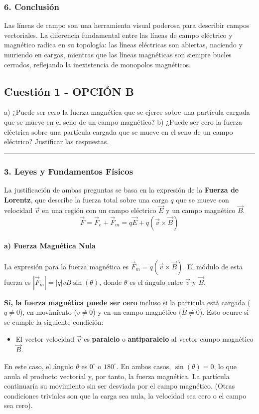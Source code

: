 \subsubsection*{6. Conclusión}
\begin{cajaconclusion}
Las líneas de campo son una herramienta visual poderosa para describir campos vectoriales. La diferencia fundamental entre las líneas de campo eléctrico y magnético radica en su topología: las líneas eléctricas son abiertas, naciendo y muriendo en cargas, mientras que las líneas magnéticas son siempre bucles cerrados, reflejando la inexistencia de monopolos magnéticos.
\end{cajaconclusion}

\newpage

\subsection{Cuestión 1 - OPCIÓN B}
\label{subsec:4B_2000_sep_ext}

\begin{cajaenunciado}
a) ¿Puede ser cero la fuerza magnética que se ejerce sobre una partícula cargada que se mueve en el seno de un campo magnético?
b) ¿Puede ser cero la fuerza eléctrica sobre una partícula cargada que se mueve en el seno de un campo eléctrico?
Justificar las respuestas.
\end{cajaenunciado}
\hrule

\subsubsection*{3. Leyes y Fundamentos Físicos}
La justificación de ambas preguntas se basa en la expresión de la \textbf{Fuerza de Lorentz}, que describe la fuerza total sobre una carga $q$ que se mueve con velocidad $\vec{v}$ en una región con un campo eléctrico $\vec{E}$ y un campo magnético $\vec{B}$.
$$ \vec{F} = \vec{F}_e + \vec{F}_m = q\vec{E} + q(\vec{v} \times \vec{B}) $$

\paragraph{a) Fuerza Magnética Nula}
La expresión para la fuerza magnética es $\vec{F}_m = q(\vec{v} \times \vec{B})$. El módulo de esta fuerza es $|\vec{F}_m| = |q|vB\sin(\theta)$, donde $\theta$ es el ángulo entre $\vec{v}$ y $\vec{B}$.

\textbf{Sí, la fuerza magnética puede ser cero} incluso si la partícula está cargada ($q \neq 0$), en movimiento ($v \neq 0$) y en un campo magnético ($B \neq 0$). Esto ocurre si se cumple la siguiente condición:
\begin{itemize}
    \item El vector velocidad $\vec{v}$ es \textbf{paralelo} o \textbf{antiparalelo} al vector campo magnético $\vec{B}$.
\end{itemize}
En este caso, el ángulo $\theta$ es $0^\circ$ o $180^\circ$. En ambos casos, $\sin(\theta) = 0$, lo que anula el producto vectorial y, por tanto, la fuerza magnética. La partícula continuaría su movimiento sin ser desviada por el campo magnético.
(Otras condiciones triviales son que la carga sea nula, la velocidad sea cero o el campo sea cero).

